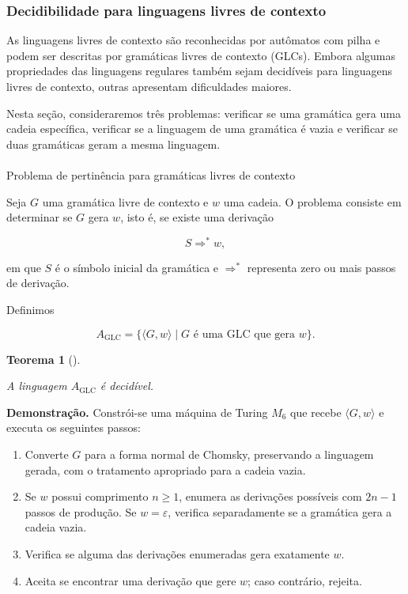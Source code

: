 \documentclass[
  brazilian,
  letterpaper,
]{book}
\makeatletter
\let\oldparagraph\paragraph
\renewcommand{\paragraph}{
    \@ifstar
      \xxxParagraphStar
      \xxxParagraphNoStar
  }
\newcommand{\xxxParagraphStar}[1]{\oldparagraph*{#1}\mbox{}}
\newcommand{\xxxParagraphNoStar}[1]{\oldparagraph{#1}\mbox{}}
\providecommand{\tightlist}{%
  \setlength{\itemsep}{0pt}\setlength{\parskip}{0pt}}
\theoremstyle{plain}
\newtheorem{theorem}{Teorema}[chapter]
\theoremstyle{definition}
\theoremstyle{remark}
\makeatother
\begin{document}
\subsubsection{Decidibilidade para linguagens livres de
contexto}\label{decidibilidade-para-linguagens-livres-de-contexto}

As linguagens livres de contexto são reconhecidas por autômatos com
pilha e podem ser descritas por gramáticas livres de contexto (GLCs).
Embora algumas propriedades das linguagens regulares também sejam
decidíveis para linguagens livres de contexto, outras apresentam
dificuldades maiores.

Nesta seção, consideraremos três problemas: verificar se uma gramática
gera uma cadeia específica, verificar se a linguagem de uma gramática é
vazia e verificar se duas gramáticas geram a mesma linguagem.

\paragraph{Problema de pertinência para gramáticas livres de
contexto}\label{problema-de-pertinuxeancia-para-gramuxe1ticas-livres-de-contexto}

Seja \(G\) uma gramática livre de contexto e \(w\) uma cadeia. O
problema consiste em determinar se \(G\) gera \(w\), isto é, se existe
uma derivação

\[
S\Rightarrow^* w,
\]

em que \(S\) é o símbolo inicial da gramática e \(\Rightarrow^*\)
representa zero ou mais passos de derivação.

Definimos

\[
A_{\mathrm{GLC}}=\{\langle G,w\rangle\mid G\text{ é uma GLC que gera }w\}.
\]

\begin{theorem}[]\protect\hypertarget{thm-glc}{}\label{thm-glc}

A linguagem \(A_{\mathrm{GLC}}\) é decidível.

\end{theorem}

\textbf{Demonstração.} Constrói-se uma máquina de Turing \(M_6\) que
recebe \(\langle G,w\rangle\) e executa os seguintes passos:

\begin{enumerate}
\def\labelenumi{\arabic{enumi}.}
\tightlist
\item
  Converte \(G\) para a forma normal de Chomsky, preservando a linguagem
  gerada, com o tratamento apropriado para a cadeia vazia.
\item
  Se \(w\) possui comprimento \(n\geq 1\), enumera as derivações
  possíveis com \(2n-1\) passos de produção. Se \(w=\varepsilon\),
  verifica separadamente se a gramática gera a cadeia vazia.
\item
  Verifica se alguma das derivações enumeradas gera exatamente \(w\).
\item
  Aceita se encontrar uma derivação que gere \(w\); caso contrário,
  rejeita.
\end{enumerate}
\end{document}
